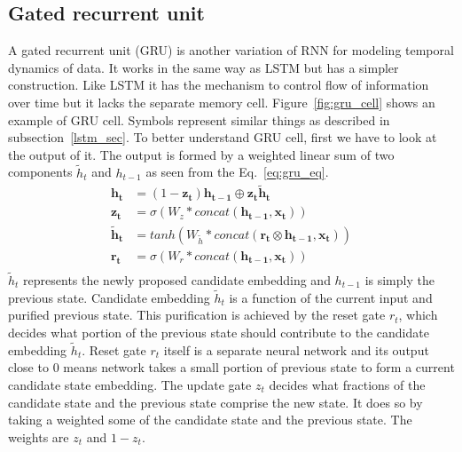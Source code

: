 \documentclass[10pt,twocolumn,letterpaper]{article}
\begin{document}
\subsection{Gated recurrent unit}
A gated recurrent unit (GRU) is another variation of RNN for modeling temporal dynamics of data. It works in the same way as LSTM
but has a simpler construction. Like LSTM it has the mechanism to control flow of information over time but it lacks the separate memory cell. 
Figure~\ref{fig:gru_cell} shows an example of GRU cell. Symbols represent similar things as described in subsection~\ref{lstm_sec}. 
To better understand GRU cell, first we have to look at the output of it. The output is formed by a weighted linear sum of two components $\tilde{h}_t$ and $h_{t-1}$ as seen from the Eq.~\ref{eq:gru_eq}. 
\begin{equation}
	\label{eq:gru_eq}
	\begin{aligned}
		\mathbf{h_t} & = (1-\mathbf{z_{t}})\mathbf{h_{t-1}} \oplus \mathbf{z_{t}}\mathbf{\tilde{h}_t} \\
		\mathbf{z_{t}} &= \sigma(W_z*concat(\mathbf{h_{t-1}}, \mathbf{x_t})) \\
		\mathbf{\tilde{h}_t} &= tanh(W_{\tilde{h}}*concat(\mathbf{r_t} \otimes \mathbf{h_{t-1}}, \mathbf{x_t})) \\
		\mathbf{r_t} &= \sigma(W_r*concat(\mathbf{h_{t-1}}, \mathbf{x_t})) \\
	\end{aligned}
\end{equation}
$\tilde{h}_t$ represents the 
newly proposed candidate embedding and $h_{t-1}$ is simply the previous state. Candidate embedding $\tilde{h}_t$ is a function of the current input and purified previous state. This purification is achieved by the reset gate $r_{t}$, which decides
what portion of the 
previous state should contribute to the 
candidate embedding $\tilde{h}_t$. Reset gate $r_{t}$ itself is a separate neural network and its output close to $0$ means network takes a small portion of previous state to form a current candidate state embedding. The update gate $z_{t}$ decides what fractions of the candidate state and the previous state comprise the new state. It does so by taking a weighted some of the candidate state and the previous state. The weights are $z_{t}$ and $1-z_{t}$. %
\end{document}
